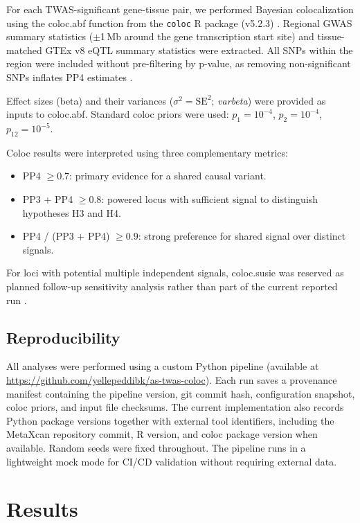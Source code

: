 \documentclass[12pt,a4paper]{article}
\begin{document}
For each TWAS-significant gene-tissue pair, we performed Bayesian
colocalization using the coloc.abf function from the \texttt{coloc} R
package (v5.2.3) \citep{Giambartolomei2014}.
Regional GWAS summary statistics ($\pm$1\,Mb around the gene transcription
start site) and tissue-matched GTEx v8 eQTL summary statistics were extracted.
All SNPs within the region were included without pre-filtering by p-value,
as removing non-significant SNPs inflates PP4 estimates \citep{Wallace2021}.

Effect sizes (beta) and their variances ($\sigma^2 = \mathrm{SE}^2$;
\textit{varbeta}) were provided as inputs to coloc.abf.
Standard coloc priors were used: $p_1 = 10^{-4}$, $p_2 = 10^{-4}$,
$p_{12} = 10^{-5}$.

Coloc results were interpreted using three complementary metrics:
\begin{itemize}
  \item PP4 $\geq 0.7$: primary evidence for a shared causal variant.
  \item PP3 + PP4 $\geq 0.8$: powered locus with sufficient signal to
        distinguish hypotheses H3 and H4.
  \item PP4 / (PP3 + PP4) $\geq 0.9$: strong preference for shared
        signal over distinct signals.
\end{itemize}

For loci with potential multiple independent signals, coloc.susie was
reserved as planned follow-up sensitivity analysis rather than part of the
current reported run \citep{Wallace2021}.

\subsection{Reproducibility}

All analyses were performed using a custom Python pipeline
(available at \url{https://github.com/yellepeddibk/as-twas-coloc}).
Each run saves a provenance manifest containing the pipeline version,
git commit hash, configuration snapshot, coloc priors, and input file checksums.
The current implementation also records Python package versions together with
external tool identifiers, including the MetaXcan repository commit, R
version, and coloc package version when available.
Random seeds were fixed throughout.
The pipeline runs in a lightweight mock mode for CI/CD validation without
requiring external data.

\section{Results}
\end{document}
